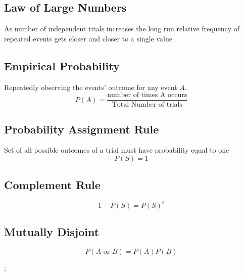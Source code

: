 \documentclass[11pt]{article}
\begin{document}
   \subsection*{Law of Large Numbers}
   As number of independent trials increases the long run relative frequency of repeated events gets closer and closer to a single value
   \subsection*{Empirical Probability}
   Repeatedly observing the events' outcome for any event $A$.
     \begin{equation}
     P(A)= \frac{\text{number of times A occurs}} {\text{Total Number of trials}}
     \end{equation}

    \subsection*{Probability Assignment Rule} 
    Set of all possible outcomes of a trial must have probability equal to one
        \begin{equation}
        P(S)=1
        \end{equation}
        
     \subsection*{Complement Rule}
         \begin{equation}
         1-P(S)=P(S)^c         \end{equation}
    
    \subsection*{Mutually Disjoint}
        \begin{equation}
        P(A\text{ or }B) = P(A)P(B)
        \end{equation}
        
\pagestyle{empty}
\def\rectangle{(0,0)--(0,4)--(4,4)--(4,0)--cycle}
\def\uncircle{(1,1) circle (1cm)}
\def\deuxcircle{(3,3) circle (1cm)}
;
\end{document}
